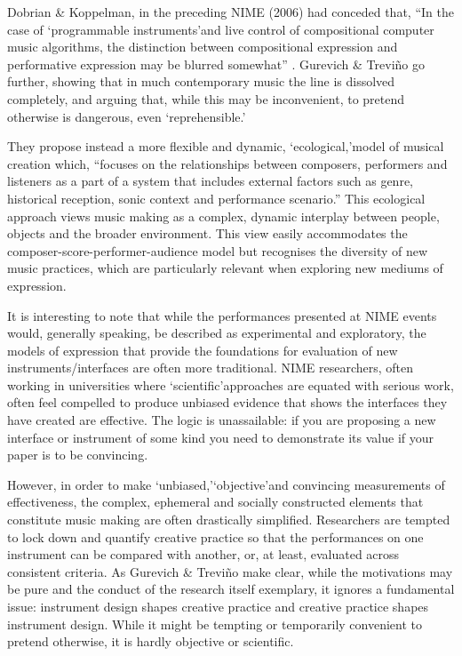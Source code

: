 Dobrian \& Koppelman, in the preceding NIME (2006) had conceded that, ``In the case of \lq programmable instruments\rq  and live control of compositional computer music algorithms, the distinction between compositional expression and performative expression may be blurred somewhat'' \cite{Dobrian:2006}.  Gurevich \& Trevi\~{n}o go further, showing that in much contemporary music the line is dissolved completely, and arguing that, while this may be inconvenient, to pretend otherwise is dangerous, even \lq reprehensible.\rq

They propose instead a more flexible and dynamic, \lq ecological,\rq model of musical creation which, ``focuses on the relationships between composers, performers and listeners as a part of a system that includes external factors such as genre, historical reception, sonic context and performance scenario.''  This ecological approach views music making as a complex, dynamic interplay between people, objects and the broader environment.  This view easily accommodates the composer-score-performer-audience model but recognises the diversity of new music practices, which are particularly relevant when exploring new mediums of expression.

It is interesting to note that while the performances presented at NIME events would, generally speaking, be described as experimental and exploratory, the models of expression that provide the foundations for evaluation of new instruments/interfaces are often more traditional.  NIME researchers, often working in universities where \lq scientific\rq approaches are equated with serious work, often feel compelled to produce unbiased evidence that shows the interfaces they have created are effective.  The logic is unassailable: if you are proposing a new interface or instrument of some kind you need to demonstrate its value if your paper is to be convincing.

However, in order to make \lq unbiased,\rq \lq objective\rq and convincing measurements of effectiveness, the complex, ephemeral and socially constructed elements that constitute music making are often drastically simplified.  Researchers are tempted to lock down and quantify creative practice so that the performances on one instrument can be compared with another, or, at least, evaluated across consistent criteria.  As Gurevich \& Trevi\~{n}o make clear, while the motivations may be pure and the conduct of the research itself exemplary, it ignores a fundamental issue: instrument design shapes creative practice and creative practice shapes instrument design.  While it might be tempting or temporarily convenient to pretend otherwise, it is hardly objective or scientific.

